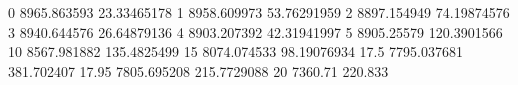 0	8965.863593	23.33465178
1	8958.609973	53.76291959
2	8897.154949	74.19874576
3	8940.644576	26.64879136
4	8903.207392	42.31941997
5	8905.25579	120.3901566
10	8567.981882	135.4825499
15	8074.074533	98.19076934
17.5	7795.037681	381.702407
17.95	7805.695208	215.7729088
20	7360.71	220.833

